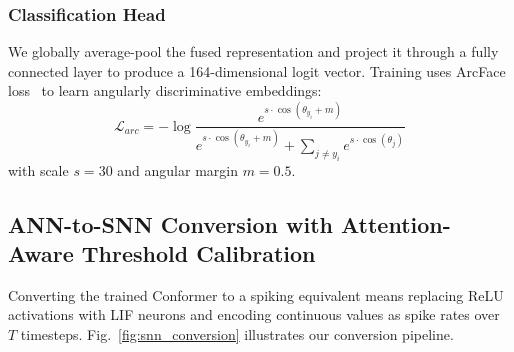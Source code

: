 \documentclass[11pt,a4paper]{article}
\begin{document}
\subsubsection{Classification Head}
We globally average-pool the fused representation and project it through a fully connected layer to produce a 164-dimensional logit vector. Training uses ArcFace loss~\cite{deng2019arcface} to learn angularly discriminative embeddings:
\begin{equation}
    \mathcal{L}_{arc} = -\log \frac{e^{s \cdot \cos(\theta_{y_i} + m)}}{e^{s \cdot \cos(\theta_{y_i} + m)} + \sum_{j \neq y_i} e^{s \cdot \cos(\theta_j)}}
\end{equation}
with scale $s = 30$ and angular margin $m = 0.5$.

\subsection{ANN-to-SNN Conversion with Attention-Aware Threshold Calibration}\label{sec:conversion}

Converting the trained Conformer to a spiking equivalent means replacing ReLU activations with LIF neurons and encoding continuous values as spike rates over $T$ timesteps. Fig.~\ref{fig:snn_conversion} illustrates our conversion pipeline.
\end{document}
